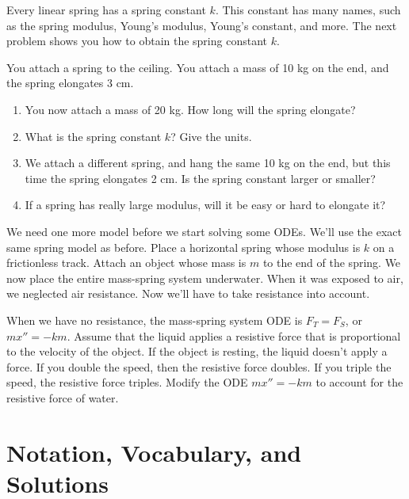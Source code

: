 Every linear spring has a spring constant $k$. This constant has many names, such as the spring modulus, Young's modulus, Young's constant, and more. The next problem shows you how to obtain the spring constant $k$.
\begin{problem}
 You attach a spring to the ceiling. You attach a mass of 10 kg on the end, and the spring elongates 3 cm.  
\begin{enumerate}
 \item You now attach a mass of 20 kg. How long will the spring elongate? 
 \item What is the spring constant $k$? Give the units.
 \item We attach a different spring, and hang the same 10 kg on the end, but this time the spring elongates 2 cm.  Is the spring constant larger or smaller?
 \item If a spring has really large modulus, will it be easy or hard to elongate it?
\end{enumerate}
\end{problem}

We need one more model before we start solving some ODEs.  We'll use the exact same spring model as before. Place a horizontal spring whose modulus is $k$ on a frictionless track. Attach an object whose mass is $m$ to the end of the spring.  
We now place the entire mass-spring system underwater. When it was exposed to air, we neglected air resistance. Now we'll have to take resistance into account.   
\begin{problem}
 When we have no resistance, the mass-spring system ODE is $F_T=F_S$, or $mx'' = -km$.  Assume that the liquid applies a resistive force that is proportional to the velocity of the object.  If the object is resting, the liquid doesn't apply a force.  If you double the speed, then the resistive force doubles.  If you triple the speed, the resistive force triples. Modify the ODE $mx''=-km$ to account for the resistive force of water. 
\end{problem}

\section{Notation, Vocabulary, and Solutions}

